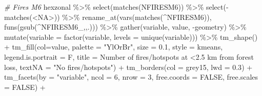 \documentclass[10pt,landscape,a3paper]{article}
\newenvironment{Shaded}{\begin{snugshade}}{\end{snugshade}}
\newcommand{\AttributeTok}[1]{\textcolor[rgb]{0.77,0.63,0.00}{#1}}
\newcommand{\CommentTok}[1]{\textcolor[rgb]{0.56,0.35,0.01}{\textit{#1}}}
\newcommand{\ConstantTok}[1]{\textcolor[rgb]{0.00,0.00,0.00}{#1}}
\newcommand{\DecValTok}[1]{\textcolor[rgb]{0.00,0.00,0.81}{#1}}
\newcommand{\FloatTok}[1]{\textcolor[rgb]{0.00,0.00,0.81}{#1}}
\newcommand{\FunctionTok}[1]{\textcolor[rgb]{0.00,0.00,0.00}{#1}}
\newcommand{\NormalTok}[1]{#1}
\newcommand{\SpecialCharTok}[1]{\textcolor[rgb]{0.00,0.00,0.00}{#1}}
\newcommand{\StringTok}[1]{\textcolor[rgb]{0.31,0.60,0.02}{#1}}
\begin{document}
\begin{Shaded}
\begin{Highlighting}[]

\CommentTok{\# Fires M6}
\NormalTok{hexzonal }\SpecialCharTok{\%\textgreater{}\%} \FunctionTok{select}\NormalTok{(}\FunctionTok{matches}\NormalTok{(}\StringTok{\textquotesingle{}NFIRESM6\textquotesingle{}}\NormalTok{)) }\SpecialCharTok{\%\textgreater{}\%} \FunctionTok{select}\NormalTok{(}\SpecialCharTok{{-}}\FunctionTok{matches}\NormalTok{(}\StringTok{\textquotesingle{}\textless{}NA\textgreater{}\textquotesingle{}}\NormalTok{)) }\SpecialCharTok{\%\textgreater{}\%} 
  \FunctionTok{rename\_at}\NormalTok{(}\FunctionTok{vars}\NormalTok{(}\FunctionTok{matches}\NormalTok{(}\StringTok{\textquotesingle{}\^{}NFIRESM6\textquotesingle{}}\NormalTok{)), }\FunctionTok{funs}\NormalTok{(}\FunctionTok{gsub}\NormalTok{(}\StringTok{\textquotesingle{}\^{}NFIRESM6\_\textquotesingle{}}\NormalTok{,}\StringTok{\textquotesingle{}\textquotesingle{}}\NormalTok{,.))) }\SpecialCharTok{\%\textgreater{}\%} 
  \FunctionTok{gather}\NormalTok{(variable, value, }\SpecialCharTok{{-}}\NormalTok{geometry) }\SpecialCharTok{\%\textgreater{}\%}
  \FunctionTok{mutate}\NormalTok{(}\AttributeTok{variable =} \FunctionTok{factor}\NormalTok{(variable, }\AttributeTok{levels =} \FunctionTok{unique}\NormalTok{(variable))) }\SpecialCharTok{\%\textgreater{}\%} 
  \FunctionTok{tm\_shape}\NormalTok{() }\SpecialCharTok{+}
  \FunctionTok{tm\_fill}\NormalTok{(}\AttributeTok{col=}\StringTok{\textquotesingle{}value\textquotesingle{}}\NormalTok{, }\AttributeTok{palette =} \StringTok{"YlOrBr"}\NormalTok{, }\AttributeTok{size =} \FloatTok{0.1}\NormalTok{,}
          \AttributeTok{style =} \StringTok{\textquotesingle{}kmeans\textquotesingle{}}\NormalTok{, }\AttributeTok{legend.is.portrait =}\NormalTok{ F, }\AttributeTok{title =} \StringTok{\textquotesingle{}Number of fires/hotspots at \textless{}2.5 km from forest loss\textquotesingle{}}\NormalTok{,}
          \AttributeTok{textNA =} \StringTok{"No fires/hotspots"}\NormalTok{) }\SpecialCharTok{+}
  \FunctionTok{tm\_borders}\NormalTok{(}\AttributeTok{col =} \StringTok{\textquotesingle{}grey15\textquotesingle{}}\NormalTok{, }\AttributeTok{lwd =} \FloatTok{0.3}\NormalTok{) }\SpecialCharTok{+}
  \FunctionTok{tm\_facets}\NormalTok{(}\AttributeTok{by =} \StringTok{"variable"}\NormalTok{, }\AttributeTok{ncol =} \DecValTok{6}\NormalTok{, }\AttributeTok{nrow =} \DecValTok{3}\NormalTok{, }\AttributeTok{free.coords =} \ConstantTok{FALSE}\NormalTok{, }\AttributeTok{free.scales =} \ConstantTok{FALSE}\NormalTok{) }\SpecialCharTok{+}

\end{Highlighting}
\end{Shaded}
\end{document}
